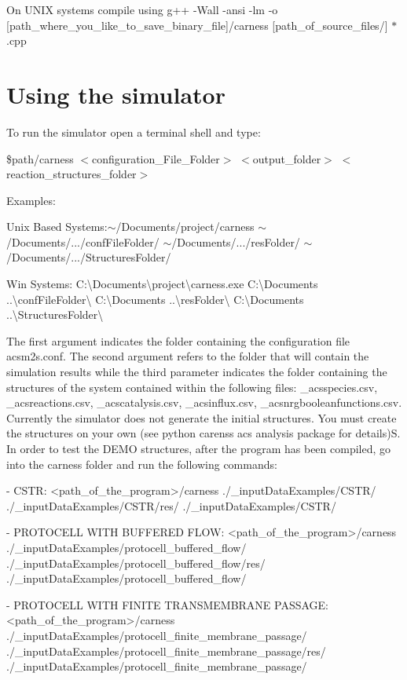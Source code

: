On U\-N\-I\-X systems compile using {\ttfamily g++} -\/\-Wall -\/ansi -\/lm -\/o \mbox{[}path\-\_\-where\-\_\-you\-\_\-like\-\_\-to\-\_\-save\-\_\-binary\-\_\-file\mbox{]}/carness \mbox{[}path\-\_\-of\-\_\-source\-\_\-files/\mbox{]} $\ast$.cpp \par
\par
\hypertarget{a00002_secUsage}{}\section{Using the simulator}\label{a00002_secUsage}
To run the simulator open a terminal shell and type\-:\par
\par
 {\ttfamily } \$path/carness {\ttfamily } $<$configuration\-\_\-\-File\-\_\-\-Folder$>$ {\ttfamily } $<$output\-\_\-folder$>$ {\ttfamily } $<$reaction\-\_\-structures\-\_\-folder$>$\par
 Examples\-:
\begin{DoxyItemize}
\item Unix Based Systems\-:{\ttfamily $\sim$/\-Documents/project/carness} {\ttfamily $\sim$/\-Documents/}.../conf\-File\-Folder/ {\ttfamily $\sim$/\-Documents/}.../res\-Folder/ {\ttfamily $\sim$/\-Documents/}.../\-Structures\-Folder/
\item Win Systems\-: {\ttfamily C\-:\textbackslash{}Documents\textbackslash{}project\textbackslash{}carness.\-exe} {\ttfamily C\-:\textbackslash{}Documents} ..\textbackslash{}conf\-File\-Folder\textbackslash{} {\ttfamily C\-:\textbackslash{}Documents} ..\textbackslash{}res\-Folder\textbackslash{} {\ttfamily C\-:\textbackslash{}Documents} ..\textbackslash{}Structures\-Folder\textbackslash{}
\end{DoxyItemize}

The first argument indicates the folder containing the configuration file acsm2s.\-conf. The second argument refers to the folder that will contain the simulation results while the third parameter indicates the folder containing the structures of the system contained within the following files\-: \-\_\-acsspecies.\-csv, \-\_\-acsreactions.\-csv, \-\_\-acscatalysis.\-csv, \-\_\-acsinflux.\-csv, \-\_\-acsnrgbooleanfunctions.\-csv. Currently the simulator does not generate the initial structures. You must create the structures on your own (see python carenss acs analysis package for details)S. In order to test the D\-E\-M\-O structures, after the program has been compiled, go into the carness folder and run the following commands\-: \begin{DoxyVerb}      - CSTR: <path_of_the_program>/carness ./_inputDataExamples/CSTR/ ./_inputDataExamples/CSTR/res/ ./_inputDataExamples/CSTR/

      - PROTOCELL WITH BUFFERED FLOW:  <path_of_the_program>/carness ./_inputDataExamples/protocell_buffered_flow/ ./_inputDataExamples/protocell_buffered_flow/res/ ./_inputDataExamples/protocell_buffered_flow/

      - PROTOCELL WITH FINITE TRANSMEMBRANE PASSAGE: <path_of_the_program>/carness ./_inputDataExamples/protocell_finite_membrane_passage/ ./_inputDataExamples/protocell_finite_membrane_passage/res/ ./_inputDataExamples/protocell_finite_membrane_passage/
\end{DoxyVerb}


